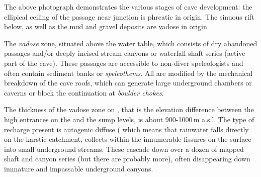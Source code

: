 \begin{marginfigure}
\caption{The above photograph demonstrates the various stages of cave development: the ellipical ceiling of the passage near  junction is phreatic in origin. The sinuous rift below, as well as the mud and gravel deposits are vadose in origin }
\label{fig:dachstein}
\end{marginfigure}
 
 The \emph{vadose} zone, situated above the water table, which consists of dry abandoned passages and/or deeply incised stream canyons or waterfall shaft series (active part of the cave). These passages are accessible to non-diver speleologists and often contain sediment banks or \emph{speleothems}. All are modified by the mechanical breakdown of the cave roofs, which can generate large underground chambers or caverns or block the continuation at \emph{boulder chokes}. 


The thickness of the vadose zone on , that is the elevation difference between the high entrances on the  and the sump levels, is about 900-1000\,m a.s.l. The type of recharge present is autogenic diffuse (\citep{ford2013karst} which means that rainwater falls directly on the karstic catchment, collects within the innumerable fissures on the surface into small underground streams. These cascade down over a dozen of mapped shaft and canyon series (but there are probably more), often disappearing down immature and impassable underground canyons. 

